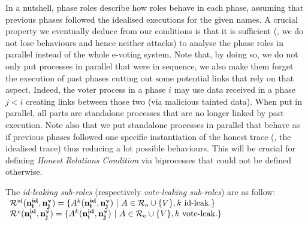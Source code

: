 In a nutshell, phase roles describe how roles behave in each phase, assuming that
previous phases followed the idealised executions for the given names.
A crucial property we eventually deduce from our conditions %
is that
it is sufficient (\ie, we do not lose behaviours and hence neither attacks)
to analyse the phase roles in parallel
instead of the whole e-voting system.
Note that, by doing so, we do not only put processes in parallel that were
in sequence, we also make them forget the execution of past phases
cutting out some potential links that rely on that aspect.
Indeed, the voter process in a phase $i$ may use data received in a phase $j<i$ creating links between those two
(\eg via malicious tainted data).
When put in parallel, all parts are standalone processes that are no longer linked by past execution.
Note also that we put standalone processes in parallel that behave as if previous phases followed
one specific instantiation of the honest trace (\ie, the idealised trace) thus reducing a lot possible behaviours.
This will be crucial for defining {\em Honest Relations Condition} via
biprocesses that could not be defined 
otherwise.

\begin{definition}
The {\em id-leaking sub-roles} (respectively {\em vote-leaking sub-roles})
are as follow:\\[0.5mm]
\null\hfill$
  \begin{array}[]{l}
  \roles^\id(\nID{i},\nV{j}) =\{A^k(\nID{i},\nV{j})\ |\  A\in\roles_o\cup\{V\}, k\text{ id-leak.}\} \\
  \roles^v(\nID{i},\nV{j}) =\{A^k(\nID{i},\nV{j})\ |\ A\in\roles_o\cup\{V\}, k\text{ vote-leak.}\} \\
  \end{array}
$\hfill\null
\end{definition}

